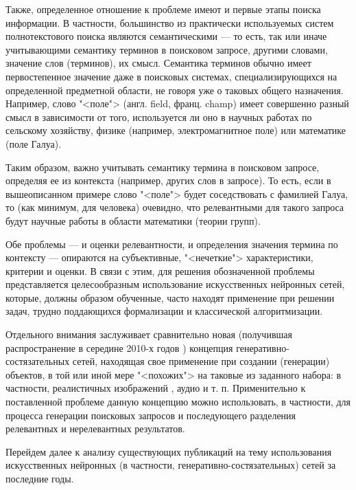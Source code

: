Также, определенное отношение к проблеме имеют и первые этапы поиска информации. В частности, большинство
из практически используемых систем полнотекстового поиска являются семантическими --- то есть, так или иначе
учитывающими семантику терминов в поисковом запросе, другими словами, значение слов (терминов), их смысл.
Семантика терминов обычно имеет первостепенное значение даже в поисковых системах, специализирующихся
на определенной предметной области, не говоря уже о таковых общего назначения. Например, слово "<поле">
(англ. field, франц. champ) имеет совершенно разный смысл в зависимости от того, используется ли
оно в научных работах по сельскому хозяйству, физике (например, электромагнитное поле) или математике
(поле Галуа).

Таким образом, важно учитывать семантику термина в поисковом запросе, определяя ее из контекста (например,
других слов в запросе). То есть, если в вышеописанном примере слово "<поле"> будет соседствовать с
фамилией Галуа, то (как минимум, для человека) очевидно, что релевантными для такого запроса будут
научные работы в области математики (теории групп).

Обе проблемы --- и оценки релевантности, и определения значения термина по контексту --- опираются
на субъективные, "<нечеткие"> характеристики, критерии и оценки. В связи с этим, для решения
обозначенной проблемы представляется целесообразным использование искусственных нейронных сетей,
которые, должны образом обученные, часто находят применение при решении задач, трудно поддающихся
формализации и классической алгоритмизации.

Отдельного внимания заслуживает сравнительно новая (получившая распространение в середине 2010-х годов
\cite{10.5555/2969033.2969125}) концепция генеративно-состязательных сетей, находящая свое применение
при создании (генерации) объектов, в той или иной мере "<похожих"> на таковые из заданного набора:
в частности, реалистичных изображений \cite{DBLP:journals/corr/abs-1809-11096, DBLP:journals/corr/abs-1812-04948},
аудио \cite{liu2020unconditional} и т. п. Применительно к поставленной проблеме данную концепцию можно
использовать, в частности, для процесса генерации поисковых запросов и последующего разделения
релевантных и нерелевантных результатов.

Перейдем далее к анализу существующих публикаций на тему использования искусственных нейронных (в частности,
генеративно-состязательных) сетей за последние годы.